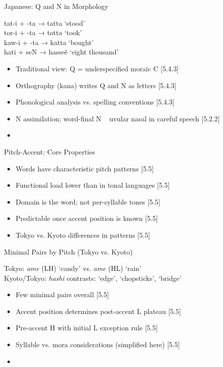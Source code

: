 \documentclass{beamer}
\newcommand{\booksrc}[1]{\hfill {\tiny [#1]}}
\begin{document}
\begin{frame}{Japanese: Q and N in Morphology}
\begin{exe}
\ex tat-i + -ta → tatta ‘stood’ \\
\ex tor-i + -ta → totta ‘took’ \\
\ex kaw-i + -ta → katta ‘bought’ \\
\ex hati + seN → hasseẽ ‘eight thousand’
\end{exe}
\begin{itemize}
\item Traditional view: Q = underspecified moraic C \booksrc{5.4.3}
\item Orthography (kana) writes Q and N as letters \booksrc{5.4.3}
\item Phonological analysis vs. spelling conventions \booksrc{5.4.3}
\item N assimilation; word-final N ~ uvular nasal in careful speech \booksrc{5.2.2}
\item %
\end{itemize}
\end{frame}


\begin{frame}{Pitch-Accent: Core Properties}
\begin{itemize}
\item Words have characteristic pitch patterns \booksrc{5.5}
\item Functional load lower than in tonal languages \booksrc{5.5}
\item Domain is the word; not per-syllable tones \booksrc{5.5}
\item Predictable once accent position is known \booksrc{5.5}
\item Tokyo vs. Kyoto differences in patterns \booksrc{5.5}
\end{itemize}
\end{frame}

\begin{frame}{Minimal Pairs by Pitch (Tokyo vs. Kyoto)}
\begin{exe}
\ex Tokyo: \textit{ame} (LH) ‘candy’ vs. \textit{ame} (HL) ‘rain’ \\
\ex Kyoto/Tokyo: \textit{hashi} contrasts: ‘edge’, ‘chopsticks’, ‘bridge’
\end{exe}
\begin{itemize}
\item Few minimal pairs overall \booksrc{5.5}
\item Accent position determines post-accent L plateau \booksrc{5.5}
\item Pre-accent H with initial L exception rule \booksrc{5.5}
\item Syllable vs. mora considerations (simplified here) \booksrc{5.5}
\item %
\end{itemize}
\end{frame}
\end{document}
